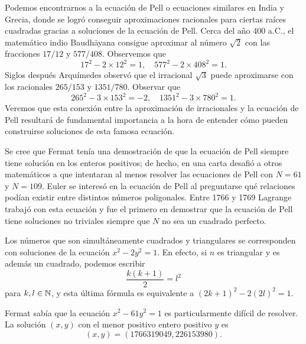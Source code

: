 Podemos encontrarnos a la ecuación de Pell o ecuaciones similares en India y
Grecia, donde se logró conseguir aproximaciones racionales para ciertas raíces
cuadradas gracias a soluciones de la ecuación de Pell. 
Cerca del año 400 a.C., el matemático
indio Baudh\=ayana consigue aproximar al número $\sqrt{2}$ con las fracciones
$17/12$ y $577/408$. Observemos que 
\[
	17^2-2\times 12^2=1,\quad
	577^2-2\times 408^2=1.
\]
Siglos después Arquímedes observó que el irracional $\sqrt{3}$ puede
aproximarse con los racionales $265/153$ y $1351/780$. Observar que
\[
	265^2-3\times 153^2=-2,\quad
	1351^2-3\times 780^2=1. 
\]
Veremos que esta
conexión entre la aproximación de irracionales y la ecuación de Pell resultará
de fundamental importancia a la hora de entender cómo pueden construirse
soluciones de esta famosa ecuación.  
	
Se cree que Fermat tenía una demostración de que la ecuación de Pell siempre
tiene solución en los enteros positivos; de hecho, en una carta desafió a otros
matemáticos a que intentaran al menos resolver las ecuaciones de Pell con
$N=61$ y $N=109$.  Euler se interesó en la ecuación de Pell al preguntarse qué
relaciones podían existir entre distintos números poligonales.  Entre 1766 y
1769 Lagrange trabajó con esta ecuación y fue el primero en demostrar que la
ecuación de Pell tiene soluciones no triviales siempre que $N$ no sea un
cuadrado perfecto. 

\begin{example}
	Los números que son simultáneamente cuadrados y triangulares se
	corresponden con soluciones de la ecuación $x^2-2y^2=1$. En efecto, si $n$
	es triangular y es además un cuadrado, podemos escribir 
	\[
		\frac{k(k+1)}{2}=l^2
	\]
	para $k,l\in\mathbb{N}$, y esta última fórmula es equivalente a
	$(2k+1)^2-2(2l)^2=1$.
\end{example}


Fermat sabía que la ecuación $x^2-61y^2=1$ es particularmente difícil de
resolver. La solución $(x,y)$ con el menor positivo entero positivo $y$ es
\[
(x,y)=(1766319049, 226153980).
\]

